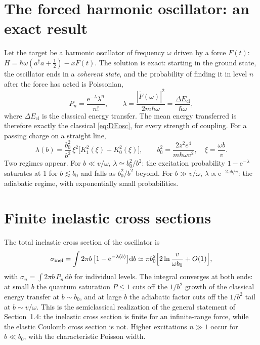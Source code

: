 \documentclass[11pt,a4paper]{book}
\numberwithin{equation}{chapter}
\newcommand{\dd}{\mathrm{d}}
\newcommand{\ee}{\mathrm{e}}
\begin{document}
\section{The forced harmonic oscillator: an exact result}\label{sec:forced}

Let the target be a harmonic oscillator of frequency $\omega$ driven by a force
$F(t)$: $H=\hbar\omega(a^\dagger a+\tfrac12)-xF(t)$. The solution is exact: starting
in the ground state, the oscillator ends in a \emph{coherent state}, and the
probability of finding it in level $n$ after the force has acted is Poissonian,
\begin{equation}\label{eq:poisson}
  P_n=\frac{\ee^{-\lambda}\lambda^n}{n!},\qquad
  \lambda=\frac{|\tilde F(\omega)|^2}{2m\hbar\omega}=\frac{\Delta E_{\mathrm{cl}}}{\hbar\omega},
\end{equation}
where $\Delta E_{\mathrm{cl}}$ is the classical energy transfer. The mean energy
transferred is therefore exactly the classical \eqref{eq:DEosc}, for every
strength of coupling. For a passing charge on a straight line,
\begin{equation}\label{eq:lambda-b}
  \lambda(b)=\frac{b_0^2}{b^2}\,\xi^2\bigl[K_1^2(\xi)+K_0^2(\xi)\bigr],\qquad
  b_0^2=\frac{2z^2e^4}{m\hbar\omega v^2},\quad\xi=\frac{\omega b}{v}.
\end{equation}
Two regimes appear. For $b\ll v/\omega$, $\lambda\simeq b_0^2/b^2$: the excitation
probability $1-\ee^{-\lambda}$ saturates at 1 for $b\lesssim b_0$ and falls as
$b_0^2/b^2$ beyond. For $b\gg v/\omega$, $\lambda\propto\ee^{-2\omega b/v}$: the
adiabatic regime, with exponentially small probabilities.

\section{Finite inelastic cross sections}

The total inelastic cross section of the oscillator is
\begin{equation}\label{eq:sig-osc}
  \sigma_{\mathrm{inel}}=\int2\pi b\,\bigl[1-\ee^{-\lambda(b)}\bigr]\dd b
  \simeq\pi b_0^2\Bigl[2\ln\frac{v}{\omega b_0}+O(1)\Bigr],
\end{equation}
with $\sigma_n=\int2\pi b\,P_n\,\dd b$ for individual levels. The integral
converges at both ends: at small $b$ the quantum saturation $P\le1$ cuts off the
$1/b^2$ growth of the classical energy transfer at $b\sim b_0$, and at large $b$
the adiabatic factor cuts off the $1/b^2$ tail at $b\sim v/\omega$. This is the
semiclassical realization of the general statement of Section~1.4: the
inelastic cross section is finite for an infinite-range force, while the
elastic Coulomb cross section is not. Higher excitations $n\gg1$ occur for
$b\ll b_0$, with the characteristic Poisson width.
\end{document}
